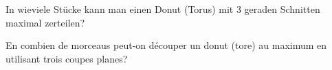 In wieviele Stücke kann man einen Donut (Torus) mit 3 geraden Schnitten maximal zerteilen?

\bigskip

En combien de morceaus peut-on découper un donut (tore) au maximum en utilisant trois coupes planes?